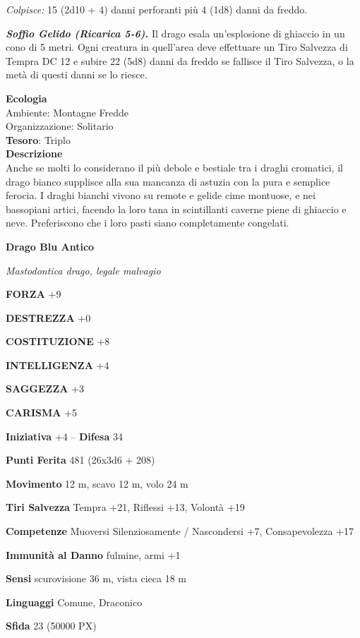 \begin{multicols}{2}
	\textit{Colpisce:} 15 (2d10 + 4) danni perforanti più 4 (1d8) danni da freddo.

	\textit{\textbf{Soffio Gelido (Ricarica 5-6).}} Il drago esala un'esplosione di ghiaccio in un cono di 5 metri. Ogni creatura in quell'area deve effettuare un Tiro Salvezza di Tempra DC 12 e subire 22 (5d8) danni da freddo se fallisce il Tiro Salvezza, o la metà di questi danni se lo riesce.

	\textbf{Ecologia}\\
	Ambiente: Montagne Fredde\\
	Organizzazione: Solitario\\
	\textbf{Tesoro}: Triplo\\
	\textbf{Descrizione}\\
	Anche se molti lo considerano il più debole e bestiale tra i draghi cromatici, il drago bianco supplisce alla sua mancanza di astuzia con la pura e semplice ferocia. I draghi bianchi vivono su remote e gelide cime montuose, e nei bassopiani artici, facendo la loro tana in scintillanti caverne piene di ghiaccio e neve. Preferiscono che i loro pasti siano completamente congelati.

	\medskip{}\textbf{Drago Blu Antico}

	\textit{Mastodontica drago, legale malvagio}

	\textbf{FORZA} +9

	\textbf{DESTREZZA} +0

	\textbf{COSTITUZIONE} +8

	\textbf{INTELLIGENZA} +4

	\textbf{SAGGEZZA} +3

	\textbf{CARISMA} +5

	\textbf{Iniziativa} +4 -- \textbf{Difesa} 34

	\textbf{Punti Ferita} 481 (26x3d6 + 208)

	\textbf{Movimento} 12 m, scavo 12 m, volo 24 m

	\textbf{Tiri Salvezza} Tempra +21, Riflessi +13, Volontà +19

	\textbf{Competenze} Muoversi Silenziosamente / Nascondersi +7, Consapevolezza +17

	\textbf{Immunità al Danno} fulmine, armi +1

	\textbf{Sensi} scurovisione 36 m, vista cieca 18 m

	\textbf{Linguaggi} Comune, Draconico

	\textbf{Sfida} 23 (50000 PX)


\end{multicols}
